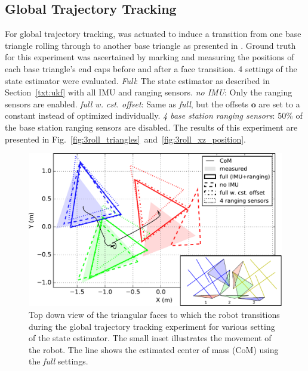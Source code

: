 {\subsection{Global Trajectory Tracking}
For global trajectory tracking, \SB{} was actuated to induce a transition from one base triangle rolling through to another base triangle as presented in \cite{sabelhaus2015system}.
Ground truth for this experiment was ascertained by marking and measuring the positions of each base triangle's end caps before and after a face transition.
4 settings of the state estimator were evaluated. \emph{Full}: The state estimator as described in Section~\ref{txt:ukf} with all IMU and ranging sensors. \emph{no IMU}: Only the ranging sensors are enabled. \emph{full w. cst. offset}: Same as \emph{full}, but the offsets $\bm{o}$ are set to a constant instead of optimized individually. \emph{4 base station ranging sensors}: 50\% of the base station ranging sensors are disabled. 
The results of this experiment are presented in Fig.~\ref{fig:3roll_triangles}~and~\ref{fig:3roll_xz_position}.
\begin{figure}[tpbh]
 \centering
  \includegraphics[width=\linewidth]{tex/img/top_view.pdf}
\caption{Top down view of the triangular faces to which the robot transitions during the global trajectory tracking experiment for various setting of the state estimator. The small inset illustrates the movement of the robot. The line shows the estimated center of mass (CoM) using the \emph{full} settings.
}
\end{figure}}
